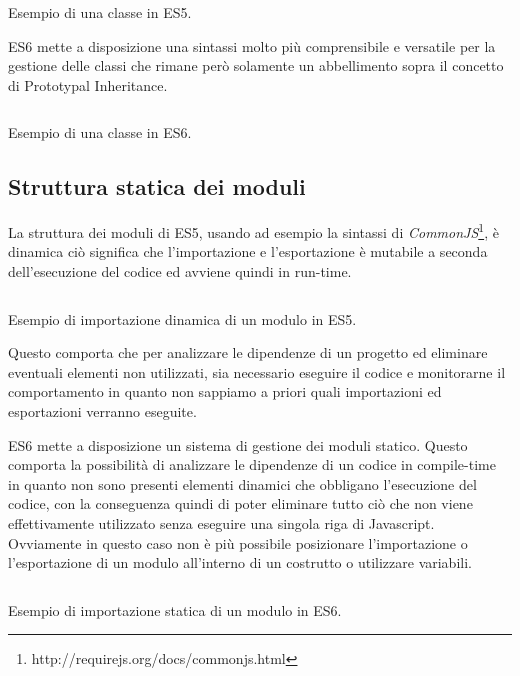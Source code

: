 \begin{listing}[ht]
\inputminted{Javascript}{sources/examplePrototypeInheritanceES5.js}
\caption{Esempio di una classe in ES5.}
\label{examplePrototypeInheritanceES5}
\end{listing}

\noindent
ES6 mette a disposizione una sintassi molto più comprensibile e versatile per la gestione delle classi che rimane però solamente un abbellimento sopra il concetto di Prototypal Inheritance. 

\begin{listing}[ht]
\inputminted{Javascript}{sources/exampleClassES6.js}
\caption{Esempio di una classe in ES6.}
\label{exampleClassES6}
\end{listing}

\subsection{Struttura statica dei moduli}
La struttura dei moduli di ES5, usando ad esempio la sintassi di \textit{CommonJS}\footnote{http://requirejs.org/docs/commonjs.html}, è dinamica ciò significa che l'importazione e l'esportazione è mutabile a seconda dell'esecuzione del codice ed avviene quindi in run-time. 

\begin{listing}[ht]
\inputminted{Javascript}{sources/exampleDynamicImportES5.js}
\caption{Esempio di importazione dinamica di un modulo in ES5.} 
\label{exampleDynamicImportES5}
\end{listing}

\noindent
Questo comporta che per analizzare le dipendenze di un progetto ed eliminare eventuali elementi non utilizzati, sia necessario eseguire il codice e monitorarne il comportamento in quanto non sappiamo a priori quali importazioni ed esportazioni verranno eseguite.

ES6 mette a disposizione un sistema di gestione dei moduli statico. Questo comporta la possibilità di analizzare le dipendenze di un codice in compile-time in quanto non sono presenti elementi dinamici che obbligano l'esecuzione del codice, con la conseguenza quindi di poter eliminare tutto ciò che non viene effettivamente utilizzato senza eseguire una singola riga di Javascript.
Ovviamente in questo caso non è più possibile posizionare l'importazione o l'esportazione di un modulo all'interno di un costrutto o utilizzare variabili.

\begin{listing}[ht]
\inputminted{Javascript}{sources/exampleImportExportES6.js}
\caption{Esempio di importazione statica di un modulo in ES6.} 
\label{exampleImportExportES6} 
\end{listing}

